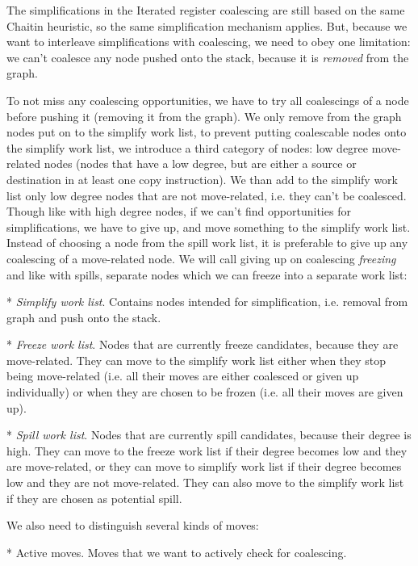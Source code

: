 The simplifications in the Iterated register coalescing are still based on the
same Chaitin heuristic, so the same simplification mechanism applies. But,
because we want to interleave simplifications with coalescing, we need to obey
one limitation: we can't coalesce any node pushed onto the stack, because it is
{\em removed} from the graph.


To not miss any coalescing opportunities, we have to try all coalescings of a
node before pushing it (removing it from the graph). We only remove from the
graph nodes put on to the simplify work list, to prevent putting coalescable
nodes onto the simplify work list, we introduce a third category of nodes: low
degree move-related nodes (nodes that have a low degree, but are either a source
or destination in at least one copy instruction). We than add to the simplify
work list only low degree nodes that are not move-related, i.e. they can't be
coalesced. Though like with high degree nodes, if we can't find opportunities
for simplifications, we have to give up, and move something to the simplify work
list. Instead of choosing a node from the spill work list, it is preferable to
give up any coalescing of a move-related node. We will call giving up on
coalescing {\em freezing} and like with spills, separate nodes which we can
freeze into a separate work list:

\begitems
* {\em Simplify work list}. Contains nodes intended for simplification, i.e. removal
from graph and push onto the stack.

* {\em Freeze work list}. Nodes that are currently freeze candidates, because
they are move-related. They can move to the simplify work list either when they
stop being move-related (i.e. all their moves are either coalesced or given up
individually) or when they are chosen to be frozen (i.e. all their moves are
given up).

* {\em Spill work list}. Nodes that are currently spill candidates, because their
degree is high. They can move to the freeze work list if their degree becomes
low and they are move-related, or they can move to simplify work list if their
degree becomes low and they are not move-related. They can also move to the
simplify work list if they are chosen as potential spill.
\enditems

We also need to distinguish several kinds of moves:

\begitems

* Active moves. Moves that we want to actively check for coalescing.

